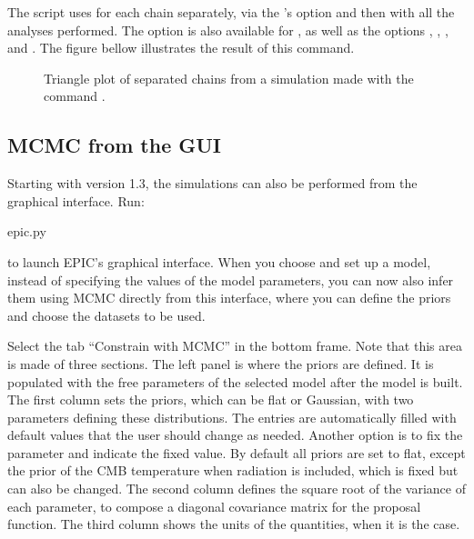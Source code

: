 \documentclass[letterpaper,12pt,english]{sphinxhowto}
\begin{document}
The script uses  for each chain separately, via the ’s
option  and then  with all the analyses performed.
The option  is also available for , as well as the
options , , ,  and .
The figure bellow illustrates the result of this command.

\begin{figure}[!tb]
\centering
\capstart

\noindent{}
\caption{Triangle plot of separated chains from a simulation made with the command .}\label{\detokenize{MCMC:id15}}\end{figure}


\subsection{MCMC from the GUI}
\label{\detokenize{GUIMCMC::doc}}\label{\detokenize{GUIMCMC:mcmc-from-the-gui}}
Starting with version 1.3, the simulations can also be performed from the
graphical interface.
Run:

%
\begin{sphinxVerbatim}[commandchars=\\\{\}]
\PYGZdl{} epic.py
\end{sphinxVerbatim}

to launch EPIC’s graphical interface.
When you choose and set up a model, instead of specifying the values of the
model parameters, you can now also infer them using MCMC directly from this
interface, where you can define the priors and choose the datasets to be used.

Select the tab “Constrain with MCMC” in the bottom frame.
Note that this area is made of three sections.
The left panel is where the priors are defined.
It is populated with the free parameters of the selected model after the model is
built.
The first column sets the priors, which can be flat or Gaussian, with two
parameters defining these distributions.
The entries are automatically filled with default values that the user should
change as needed.
Another option is to fix the parameter and indicate the fixed value.
By default all priors are set to flat, except the prior of the CMB temperature
when radiation is included, which is fixed but can also be changed.
The second column defines the square root of the variance of each parameter, to
compose a diagonal covariance matrix for the proposal function.
The third column shows the units of the quantities, when it is the case.
\end{document}
